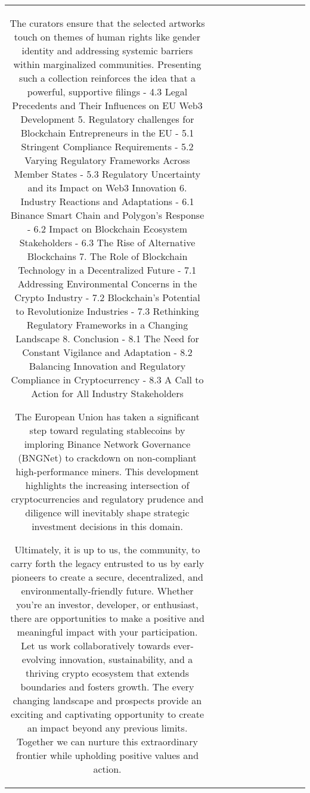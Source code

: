 \begin{table}[h!]
\begin{tabular}{|c|c|c|c|c|c|c|c|c|c|c|}
The curators ensure that the selected artworks touch on themes of human rights like gender identity and addressing systemic barriers within marginalized communities. Presenting such a collection reinforces the idea that a powerful, supportive filings - 4.3 Legal Precedents and Their Influences on EU Web3 Development 5. Regulatory challenges for Blockchain Entrepreneurs in the EU - 5.1 Stringent Compliance Requirements - 5.2 Varying Regulatory Frameworks Across Member States - 5.3 Regulatory Uncertainty and its Impact on Web3 Innovation 6. Industry Reactions and Adaptations - 6.1 Binance Smart Chain and Polygon’s Response - 6.2 Impact on Blockchain Ecosystem Stakeholders - 6.3 The Rise of Alternative Blockchains 7. The Role of Blockchain Technology in a Decentralized Future - 7.1 Addressing Environmental Concerns in the Crypto Industry - 7.2 Blockchain’s Potential to Revolutionize Industries - 7.3 Rethinking Regulatory Frameworks in a Changing Landscape 8. Conclusion - 8.1 The Need for Constant Vigilance and Adaptation - 8.2 Balancing Innovation and Regulatory Compliance in Cryptocurrency - 8.3 A Call to Action for All Industry Stakeholders

The European Union has taken a significant step toward regulating stablecoins by imploring Binance Network Governance (BNGNet) to crackdown on non-compliant high-performance miners. This development highlights the increasing intersection of cryptocurrencies and regulatory prudence and diligence will inevitably shape strategic investment decisions in this domain.

Ultimately, it is up to us, the community, to carry forth the legacy entrusted to us by early pioneers to create a secure, decentralized, and environmentally-friendly future. Whether you’re an investor, developer, or enthusiast, there are opportunities to make a positive and meaningful impact with your participation. Let us work collaboratively towards ever-evolving innovation, sustainability, and a thriving crypto ecosystem that extends boundaries and fosters growth. The every changing landscape and prospects provide an exciting and captivating opportunity to create an impact beyond any previous limits. Together we can nurture this extraordinary frontier while upholding positive values and action.


\end{tabular}
\end{table}
